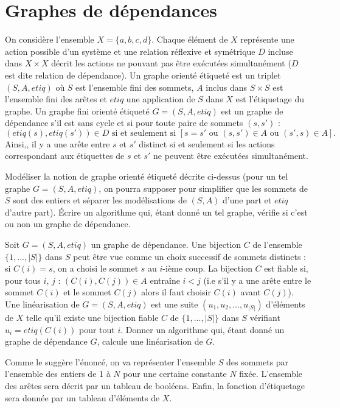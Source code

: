 \renewcommand{\SourceFile}{5-graphes/src/5-5.ml}

\section{Graphes de dépendances}

On considère l'ensemble $X=\{a,b,c,d\}$. Chaque élément de $X$ représente une action possible d'un système et une relation réflexive et symétrique $D$ incluse dans $X \times X$ décrit les actions ne pouvant pas être exécutées simultanément ($D$ est dite relation de dépendance). Un graphe orienté étiqueté est un triplet $(S,A,etiq)$ où $S$ est l'ensemble fini des sommets, $A$ inclus dans $S \times S$ est l'ensemble fini des arêtes et $etiq$ une application de $S$ dans $X$ est l'étiquetage du graphe. Un graphe fini orienté étiqueté $G=(S,A,etiq)$ est un graphe de dépendance s'il est sans cycle et si pour toute paire de sommets $(s,s')$ :
\[
    (etiq(s),etiq(s')) \in D \textrm{ si et seulement si } [s=s' \textrm{ ou } (s,s') \in A \textrm{ ou } (s',s) \in A].
\]
Ainsi,, il y a une arête entre $s$ et $s'$ distinct si et seulement si les actions correspondant aux étiquettes de $s$ et $s'$ ne peuvent être exécutées simultanément.

\Q
Modéliser la notion de graphe orienté étiqueté décrite ci-dessus (pour un tel graphe $G=(S,A,etiq)$, on pourra supposer pour simplifier que les sommets de $S$ sont des entiers et séparer les modélisations de $(S,A)$ d'une part et $etiq$ d'autre part). Écrire un algorithme qui, étant donné un tel graphe, vérifie si c'est ou non un graphe de dépendance.

\Q
Soit $G=(S,A,etiq)$ un graphe de dépendance. Une bijection $C$ de l'ensemble $\{1,...,|S|\}$ dans $S$ peut être vue comme un choix successif de sommets distincts : si $C(i)=s$, on a choisi le sommet $s$ au $i$-ième coup. La bijection $C$ est fiable si, pour tous $i$, $j$ : $(C(i),C(j)) \in A$ entraîne $i < j$ (i.e s'il y a une arête entre le sommet $C(i)$ et le sommet $C(j)$ alors il faut choisir $C(i)$ avant $C(j)$). Une linéarisation de $G=(S,A,etiq)$ est une suite $(u_1,u_2,...,u_{|S|})$ d'éléments de $X$ telle qu'il existe une bijection fiable $C$ de $\{1,...,|S|\}$ dans $S$ vérifiant $u_i=etiq(C(i))$ pour tout $i$. Donner un algorithme qui, étant donné un graphe de dépendance $G$, calcule une linéarisation de $G$.

\Corrige

\Q
Comme le suggère l'énoncé, on va représenter l'ensemble $S$ des sommets par l'ensemble des entiers de 1 à $N$ pour une certaine constante $N$ fixée. L'ensemble des arêtes sera décrit par un tableau de booléens. Enfin, la fonction d'étiquetage sera donnée par un tableau d'éléments de $X$.
\medskip

